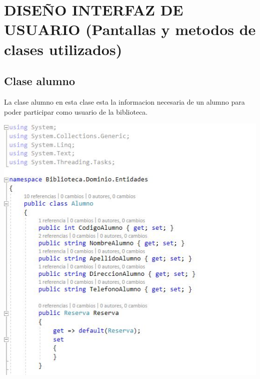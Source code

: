 \section{ DISEÑO INTERFAZ DE USUARIO (Pantallas y metodos de clases utilizados)} 
  \subsection{Clase alumno}
  La clase alumno en esta clase esta la informacion necesaria de un alumno para poder participar como usuario de la biblioteca.
	\begin{center}
	\includegraphics[width=14cm]{./Imagenes/img101} 
	\end{center}

	
	
 \newpage
